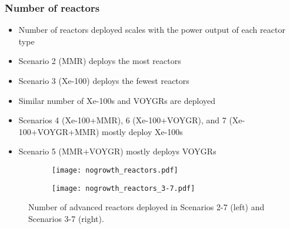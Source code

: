 \begin{frame}
    \frametitle{Number of reactors}
            \begin{itemize}
                \item Number of reactors deployed scales with the power 
                      output of each reactor type
                \item Scenario 2 (MMR) deploys the most reactors
                \item Scenario 3 (Xe-100) deploys the fewest reactors
                \item Similar number of Xe-100s and VOYGRs are deployed
                \item Scenarios 4 (Xe-100+MMR), 6 (Xe-100+VOYGR), and 7 
                      (Xe-100+VOYGR+MMR) mostly deploy Xe-100s 
                \item Scenario 5 (MMR+VOYGR) mostly deploys VOYGRs
            \end{itemize}
        \begin{figure}
        \begin{subfigure}{0.48\textwidth}
                \centering
                \texttt{[image: nogrowth\_reactors.pdf]}
        \end{subfigure}
        \hfill
        \begin{subfigure}{0.48\textwidth}
            \centering
            \texttt{[image: nogrowth\_reactors\_3-7.pdf]}
        \end{subfigure}
        \vspace{-0.15cm}
        \caption{Number of advanced reactors deployed in Scenarios 2-7 (left)
        and Scenarios 3-7 (right).}
        \end{figure}
\end{frame}

